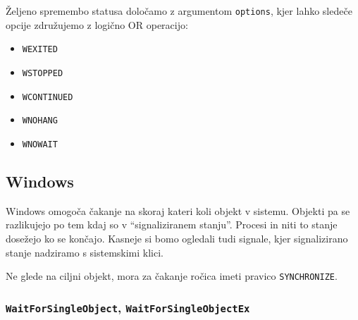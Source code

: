 \documentclass[a4paper,12pt,openright]{book}
\begin{document}
Željeno spremembo statusa določamo z argumentom \texttt{options}, kjer lahko sledeče opcije združujemo z logično OR operacijo:
\begin{itemize}
	\item \texttt{WEXITED}
	\item \texttt{WSTOPPED}
	\item \texttt{WCONTINUED}
	\item \texttt{WNOHANG}
	\item \texttt{WNOWAIT}
\end{itemize}

\subsection{Windows} \label{ssec:windows_syscalls:waiting}

Windows omogoča čakanje na skoraj kateri koli objekt v sistemu.
Objekti pa se razlikujejo po tem kdaj so v ``signaliziranem stanju''.
Procesi in niti to stanje dosežejo ko se končajo.
Kasneje si bomo ogledali tudi signale, kjer signalizirano stanje nadziramo s sistemskimi klici.

Ne glede na ciljni objekt, mora za čakanje ročica imeti pravico \texttt{SYNCHRONIZE}.

\subsubsection{\texttt{WaitForSingleObject}, \texttt{WaitForSingleObjectEx}}
\end{document}
